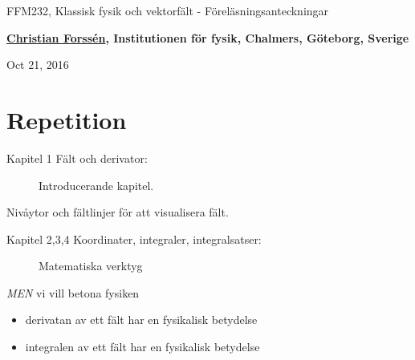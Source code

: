 \documentclass[%
oneside,                 %
final,                   %
10pt]{article}
\begin{document}






\thispagestyle{empty}

\begin{center}
{\LARGE\bf
\begin{spacing}{1.25}
FFM232, Klassisk fysik och vektorfält - Föreläsningsanteckningar
\end{spacing}
}
\end{center}


\begin{center}
{\bf \href{{http://fy.chalmers.se/subatom/tsp/}}{Christian Forssén}, Institutionen för fysik, Chalmers, Göteborg, Sverige${}^{}$} \\ [0mm]
\end{center}

\begin{center}
\end{center}
    

\begin{center}
Oct 21, 2016
\end{center}

\vspace{1cm}


\section{Repetition}
\begin{description}
 \item[Kapitel 1 Fält och derivator:] 
   Introducerande kapitel. 
\end{description}

\noindent
Nivåytor och fältlinjer för att visualisera fält.
\begin{description}
 \item[Kapitel 2,3,4 Koordinater, integraler, integralsatser:] 
   Matematiska verktyg 
\end{description}

\noindent
\emph{MEN} vi vill betona fysiken
\begin{itemize}
   \item derivatan av ett fält har en fysikalisk betydelse

   \item integralen av ett fält har en fysikalisk betydelse
\end{itemize}
\end{document}
